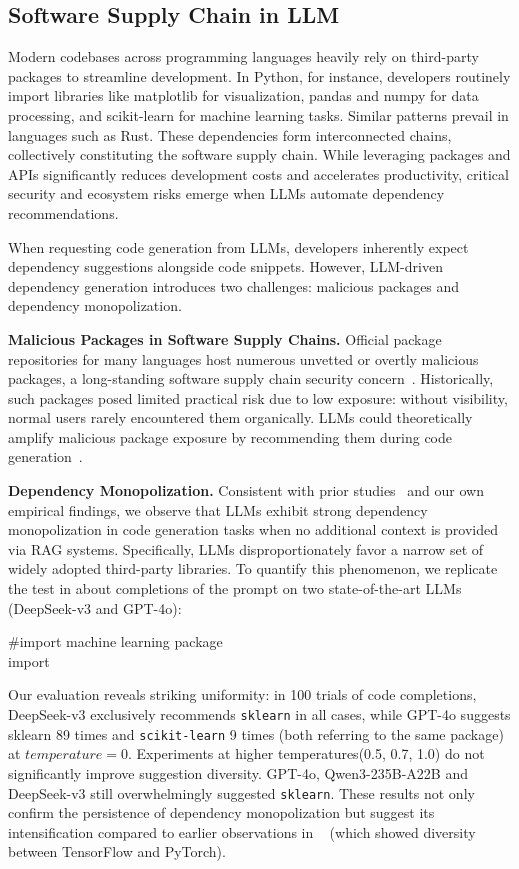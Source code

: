 \subsection{Software Supply Chain in LLM}

Modern codebases across programming languages heavily rely on third-party packages to streamline development. In Python, for instance, developers routinely import libraries like matplotlib for visualization, pandas and numpy for data processing, and scikit-learn for machine learning tasks. Similar patterns prevail in languages such as Rust. These dependencies form interconnected chains, collectively constituting the software supply chain. While leveraging packages and APIs significantly reduces development costs and accelerates productivity, critical security and ecosystem risks emerge when LLMs automate dependency recommendations.

When requesting code generation from LLMs, developers inherently expect dependency suggestions alongside code snippets. However, LLM-driven dependency generation introduces two challenges: malicious packages and dependency monopolization. 


\textbf{Malicious Packages in Software Supply Chains.} Official package repositories for many languages host numerous unvetted or overtly malicious packages, a long-standing software supply chain security concern~\citep{mal_pkg_pypi}. Historically, such packages posed limited practical risk due to low exposure: without visibility, normal users rarely encountered them organically. LLMs could theoretically amplify malicious package exposure by recommending them during code generation~\citep{supply_chain_attack_of_llm}.

\textbf{Dependency Monopolization.} Consistent with prior studies~\citep{codex} and our own empirical findings, we observe that LLMs exhibit strong dependency monopolization in code generation tasks when no additional context is provided via RAG systems. Specifically, LLMs disproportionately favor a narrow set of widely adopted third-party libraries. To quantify this phenomenon, we replicate the test in \citep{codex} about completions of the prompt on two state-of-the-art LLMs (DeepSeek-v3 and GPT-4o):
\begin{tcolorbox}
\#import machine learning package \\
import
\end{tcolorbox}
Our evaluation reveals striking uniformity: in 100 trials of code completions, DeepSeek-v3 exclusively recommends \texttt{sklearn} in all cases, while GPT-4o suggests sklearn 89 times and \texttt{scikit-learn} 9 times (both referring to the same package) at $temperature=0$. Experiments at higher temperatures(0.5, 0.7, 1.0) do not significantly improve suggestion diversity. GPT-4o, Qwen3-235B-A22B and DeepSeek-v3 still overwhelmingly suggested \texttt{sklearn}. These results not only confirm the persistence of dependency monopolization but suggest its intensification compared to earlier observations in ~\citep{codex} (which showed diversity between TensorFlow and PyTorch).


